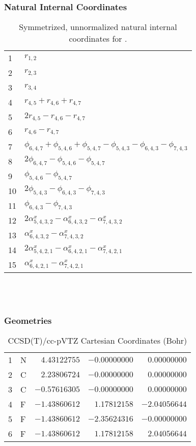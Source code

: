 \documentclass[10pt,oneside]{article}
\begin{document}
\clearpage

\subsubsection*{Natural Internal Coordinates}
\begin{table}[h!]
\centering
\caption{Symmetrized, unnormalized natural internal coordinates for .}
\small
\begin{tabular}{ll}
  1   & $r_{1,2}$ \\
  2   & $r_{2,3}$ \\
  3   & $r_{3,4}$ \\
  4   & $r_{4,5} + r_{4,6} + r_{4,7}$ \\
  5   & $2r_{4,5} - r_{4,6} - r_{4,7}$ \\
  6   & $r_{4,6} - r_{4,7}$ \\
  7   & $\phi_{6,4,7} + \phi_{5,4,6} + \phi_{5,4,7} - \phi_{5,4,3} - \phi_{6,4,3} - \phi_{7,4,3}$ \\
  8   & $2\phi_{6,4,7} - \phi_{5,4,6} - \phi_{5,4,7}$ \\
  9   & $\phi_{5,4,6} - \phi_{5,4,7}$ \\
  10  & $2\phi_{5,4,3} - \phi_{6,4,3} - \phi_{7,4,3}$ \\
  11  & $\phi_{6,4,3} - \phi_{7,4,3}$ \\
  12  & $2\alpha^x_{5,4,3,2} - \alpha^x_{6,4,3,2} - \alpha^x_{7,4,3,2}$ \\
  13  & $\alpha^x_{6,4,3,2} - \alpha^x_{7,4,3,2}$ \\
  14  & $2\alpha^x_{5,4,2,1} - \alpha^x_{6,4,2,1} - \alpha^x_{7,4,2,1}$ \\
  15  & $\alpha^x_{6,4,2,1} - \alpha^x_{7,4,2,1}$ \\
\end{tabular}
\end{table}

\clearpage

\subsection{\ \ \ }

\subsubsection*{Geometries}
\begin{table}[h!]
\centering
\caption{CCSD(T)/cc-pVTZ Cartesian Coordinates (Bohr)}
\begin{tabular}{llrrr}
1  & N  & $ 4.43122755$ & $-0.00000000$ & $ 0.00000000$ \\
2  & C  & $ 2.23806724$ & $-0.00000000$ & $ 0.00000000$ \\
3  & C  & $-0.57616305$ & $-0.00000000$ & $ 0.00000000$ \\
4  & F  & $-1.43860612$ & $ 1.17812158$ & $-2.04056644$ \\
5  & F  & $-1.43860612$ & $-2.35624316$ & $-0.00000000$ \\
6  & F  & $-1.43860612$ & $ 1.17812158$ & $ 2.04056644$ \\
\end{tabular}
\end{table}
\end{document}
